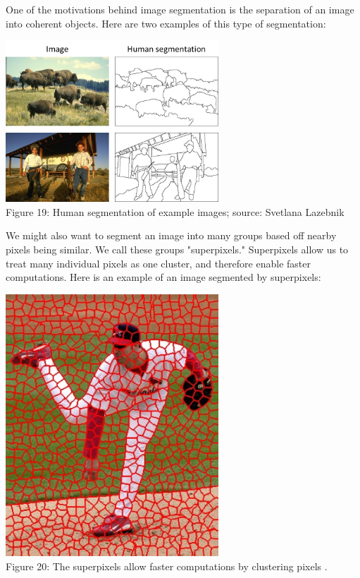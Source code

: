 \documentclass{article}
\begin{document}
One of the motivations behind image segmentation is the separation of an image into coherent objects. Here are two examples of this type of segmentation:

\begin{center}
\includegraphics[width=8cm]{objects.png} \\
Figure 19:  Human segmentation of example images; source: Svetlana Lazebnik
\end{center}

We might also want to segment an image into many groups based off nearby pixels being similar. We call these groups "superpixels." Superpixels allow us to treat many individual pixels as one cluster, and therefore enable faster computations. Here is an example of an image segmented by superpixels:

\begin{center}
\includegraphics[width=8cm]{superpixels.png} \\
Figure 20: The superpixels allow faster computations by clustering pixels \cite{ren2003learning}.
\end{center}
\end{document}

